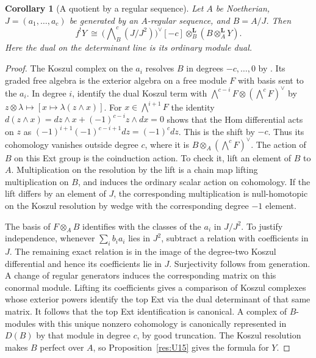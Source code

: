 \documentclass[11pt,oneside,openany]{book}
\newtheorem{corollary}[theorem]{Corollary}
\theoremstyle{definition}
\theoremstyle{remark}
\begin{document}
\begin{corollary}[A quotient by a regular sequence]\label{res:U17}
Let \(A\) be Noetherian, \(J=(a_1,\ldots,a_c)\) be generated
by an \(A\)-regular sequence, and \(B=A/J\).
Then
\[
  f^!Y\ \cong\
  \bigl(\textstyle\bigwedge\nolimits^c_B(J/J^2)\bigr)^\vee[-c]
       \otimes_B^{\mathbf L}(B\otimes_A^{\mathbf L}Y).
\]
Here the dual on the determinant line is its ordinary module dual.
\end{corollary}
\begin{proof}
The Koszul complex on the \(a_i\) resolves \(B\) in degrees
\(-c,\ldots,0\) by \cite[RK-07]{ca-core}. Its graded free
algebra is the exterior algebra on a free module \(F\) with
basis sent to the \(a_i\). In degree \(i\), identify the dual
Koszul term with \(\bigwedge^{c-i}F\otimes(\bigwedge^c F)^\vee\)
by \(z\otimes\lambda\mapsto[x\mapsto\lambda(z\wedge x)]\).
For \(x\in\bigwedge^{i+1}F\) the identity
\(d(z\wedge x)=d z\wedge x+(-1)^{c-i}z\wedge d x=0\)
shows that the Hom differential acts on \(z\) as
\((-1)^{i+1}(-1)^{c-i+1}d z=(-1)^c d z\).
This is the shift by \(-c\). Thus
its cohomology vanishes outside degree \(c\), where it is
\(B\otimes_A(\bigwedge^c F)^\vee\). The action of \(B\) on
this Ext group is the coinduction action. To check it, lift an
element of \(B\) to \(A\). Multiplication on the resolution
by the lift is a chain map lifting multiplication on \(B\),
and induces the ordinary scalar action on cohomology.
If the lift differs by an element of \(J\), the corresponding
multiplication is null-homotopic on the Koszul resolution by
wedge with the corresponding degree \(-1\) element.

The basis of \(F\otimes_A B\) identifies with the classes of
the \(a_i\) in \(J/J^2\). To justify independence, whenever
\(\sum_i b_i a_i\) lies in \(J^2\), subtract a relation with
coefficients in \(J\). The remaining exact relation is in
the image of the degree-two Koszul differential and hence its
coefficients lie in \(J\). Surjectivity follows from generation.
A change of regular generators induces the corresponding
matrix on this conormal module. Lifting its coefficients
gives a comparison of Koszul complexes whose exterior
powers identify the top Ext via the dual determinant of
that same matrix. It follows that the top Ext identification
is canonical. A complex of \(B\)-modules with this unique
nonzero cohomology is canonically represented in \(D(B)\)
by that module in degree \(c\), by good truncation.
The Koszul resolution makes \(B\) perfect over \(A\), so
Proposition~\ref{res:U15} gives the formula for \(Y\).
\end{proof}
\end{document}
